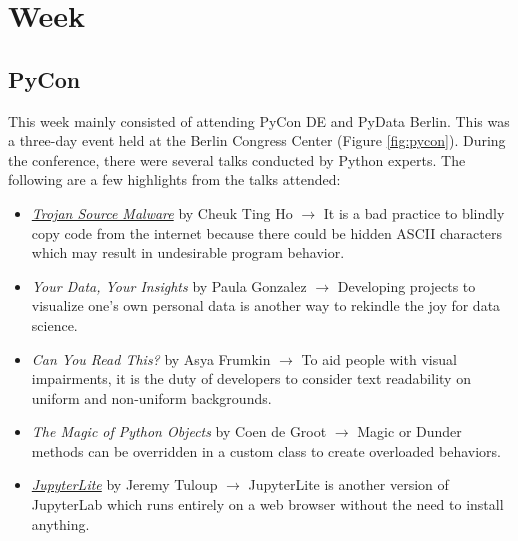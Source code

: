 \chapter{Week} %

\section{PyCon}
    
    
    This week mainly consisted of attending PyCon DE and PyData Berlin. This was a three-day event held at the Berlin Congress Center (Figure \ref{fig:pycon}). During the conference, there were several talks conducted by Python experts. The following are a few highlights from the talks attended:
    \begin{itemize}
        \item \href{https://player.vimeo.com/video/698423690}{\textit{Trojan Source Malware}} by Cheuk Ting Ho $\rightarrow$ It is a bad practice to blindly copy code from the internet because there could be hidden ASCII characters which may result in undesirable program behavior.
        \item \textit{Your Data, Your Insights} by Paula Gonzalez $\rightarrow$ Developing projects to visualize one's own personal data is another way to rekindle the joy for data science.
        \item \textit{Can You Read This?} by Asya Frumkin $\rightarrow$ To aid people with visual impairments, it is the duty of developers to consider text readability on uniform and non-uniform backgrounds.
        \item \textit{The Magic of Python Objects} by Coen de Groot $\rightarrow$ Magic or Dunder methods can be overridden in a custom class to create overloaded behaviors. 
        \item \href{https://blog.jupyter.org/jupyterlite-jupyter-%EF%B8%8F-webassembly-%EF%B8%8F-python-f6e2e41ab3fa}{\textit{JupyterLite}} by Jeremy Tuloup $\rightarrow$ JupyterLite is another version of JupyterLab which runs entirely on a web browser without the need to install anything. 
    \end{itemize} 
    
